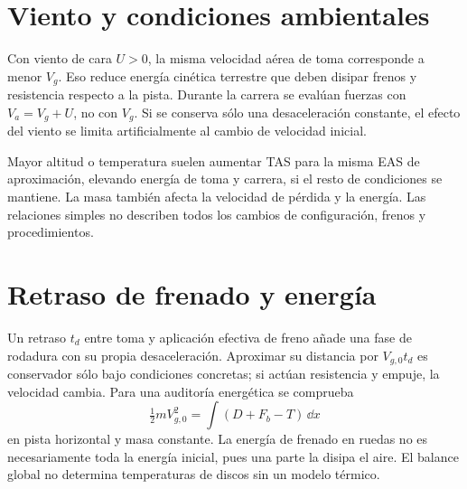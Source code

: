 
\section{Viento y condiciones ambientales}
Con viento de cara $U>0$, la misma velocidad aérea de toma corresponde a menor $V_g$. Eso reduce energía cinética terrestre que deben disipar frenos y resistencia respecto a la pista. Durante la carrera se evalúan fuerzas con $V_a=V_g+U$, no con $V_g$. Si se conserva sólo una desaceleración constante, el efecto del viento se limita artificialmente al cambio de velocidad inicial.

Mayor altitud o temperatura suelen aumentar TAS para la misma EAS de aproximación, elevando energía de toma y carrera, si el resto de condiciones se mantiene. La masa también afecta la velocidad de pérdida y la energía. Las relaciones simples no describen todos los cambios de configuración, frenos y procedimientos.


\section{Retraso de frenado y energía}
Un retraso $t_d$ entre toma y aplicación efectiva de freno añade una fase de rodadura con su propia desaceleración. Aproximar su distancia por $V_{g,0}t_d$ es conservador sólo bajo condiciones concretas; si actúan resistencia y empuje, la velocidad cambia. Para una auditoría energética se comprueba
\begin{equation}
\tfrac12mV_{g,0}^2=\int (D+F_b-T)\,\dd x
\end{equation}
en pista horizontal y masa constante. La energía de frenado en ruedas no es necesariamente toda la energía inicial, pues una parte la disipa el aire. El balance global no determina temperaturas de discos sin un modelo térmico.

